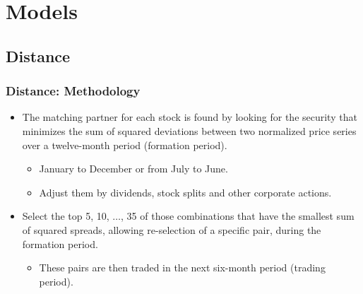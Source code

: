 \documentclass[pdf,9pt,xcolor=dvipsnames,hide notes]{beamer}
\begin{document}
	\section{Models}
\subsection{Distance}

\begin{frame}[label=frame2c]
\frametitle{Distance: Methodology}


\begin{itemize}
\justifying
\item  The matching partner for each stock is found by looking for the security that minimizes the sum of squared deviations between two normalized price series over a twelve-month period (formation period).

	\begin{itemize}
	\item January to December or from July to June.
	\item Adjust them by dividends, stock splits and other corporate actions.
	\end{itemize}


%

\vspace{0.3cm}

\pause
\item Select the top 5, 10, $\ldots$, 35 of those combinations that have the smallest sum of squared spreads, allowing re-selection of a specific pair, during the formation period. 

\pause
	\begin{itemize}
		\item These pairs are then traded in the next six-month period (trading period).
	\end{itemize}

\vspace{0.3cm}


\end{itemize}
\end{frame}
\end{document}
